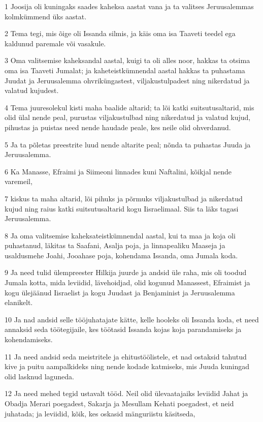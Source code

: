 \par 1 Joosija oli kuningaks saades kaheksa aastat vana ja ta valitses Jeruusalemmas kolmkümmend üks aastat.
\par 2 Tema tegi, mis õige oli Issanda silmis, ja käis oma isa Taaveti teedel ega kaldunud paremale või vasakule.
\par 3 Oma valitsemise kaheksandal aastal, kuigi ta oli alles noor, hakkas ta otsima oma isa Taaveti Jumalat; ja kaheteistkümnendal aastal hakkas ta puhastama Juudat ja Jeruusalemma ohvriküngastest, viljakustulpadest ning nikerdatud ja valatud kujudest.
\par 4 Tema juuresolekul kisti maha baalide altarid; ta lõi katki suitsutusaltarid, mis olid ülal nende peal, purustas viljakustulbad ning nikerdatud ja valatud kujud, pihustas ja puistas need nende haudade peale, kes neile olid ohverdanud.
\par 5 Ja ta põletas preestrite luud nende altarite peal; nõnda ta puhastas Juuda ja Jeruusalemma.
\par 6 Ka Manasse, Efraimi ja Siimeoni linnades kuni Naftalini, kõikjal nende varemeil,
\par 7 kiskus ta maha altarid, lõi pihuks ja põrmuks viljakustulbad ja nikerdatud kujud ning raius katki suitsutusaltarid kogu Iisraelimaal. Siis ta läks tagasi Jeruusalemma.
\par 8 Ja oma valitsemise kaheksateistkümnendal aastal, kui ta maa ja koja oli puhastanud, läkitas ta Saafani, Asalja poja, ja linnapealiku Maaseja ja usaldusmehe Joahi, Jooahase poja, kohendama Issanda, oma Jumala koda.
\par 9 Ja need tulid ülempreester Hilkija juurde ja andsid üle raha, mis oli toodud Jumala kotta, mida leviidid, lävehoidjad, olid kogunud Manassest, Efraimist ja kogu ülejäänud Iisraelist ja kogu Juudast ja Benjaminist ja Jeruusalemma elanikelt.
\par 10 Ja nad andsid selle tööjuhatajate kätte, kelle hooleks oli Issanda koda, et need annaksid seda töötegijaile, kes töötasid Issanda kojas koja parandamiseks ja kohendamiseks.
\par 11 Ja need andsid seda meistritele ja ehitustöölistele, et nad ostaksid tahutud kive ja puitu aampalkideks ning nende kodade katmiseks, mis Juuda kuningad olid lasknud laguneda.
\par 12 Ja need mehed tegid ustavalt tööd. Neil olid ülevaatajaiks leviidid Jahat ja Obadja Merari poegadest, Sakarja ja Mesullam Kehati poegadest, et neid juhatada; ja leviidid, kõik, kes oskasid mänguriistu käsitseda,
